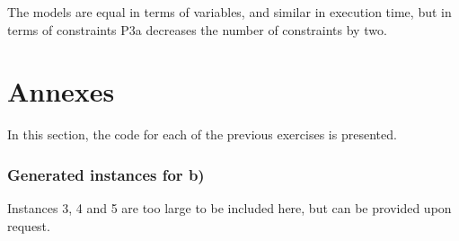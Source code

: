 \documentclass{article}
\begin{document}
The models are equal in terms of variables, and similar in execution time, but in terms of constraints P3a decreases the number of constraints by two.
\newpage
\section{Annexes}
In this section, the code for each of the previous exercises is presented.

\subsubsection*{Generated instances for b)}





\bigskip
Instances 3, 4 and 5 are too large to be included here, but can be provided upon request.
\end{document}
